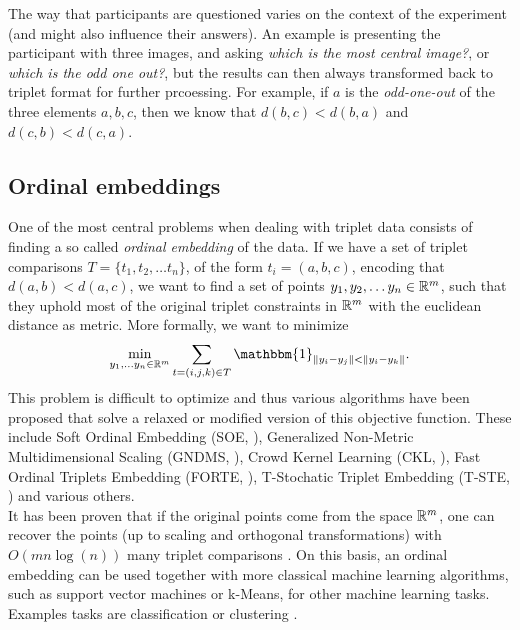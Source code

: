 The way that participants are questioned varies on the context of the experiment (and might also influence their answers). An
example is presenting the participant with three images, and asking \textit{which is the most central image?}, or \textit{which is the odd one out?},
but the results can then always transformed back to triplet format for further prcoessing. For example, if $a$ is the \textit{odd-one-out} of the three elements $a,b,c$, 
then we know that $d(b,c) < d(b,a)$ and $d(c, b) < d(c,a)$. 

\subsection{Ordinal embeddings}
One of the most central problems when dealing with triplet data consists of finding a so called \textit{ordinal embedding} of the data. If we have a set of triplet comparisons $T = \{t_1, t_2, \ldots t_n\}$, 
of the form $t_i = \left( a,b,c \right)$, encoding that $d(a,b) < d(a,c)$, 
we want to find a set of points $y_1, y_2, \ldots y_n \in \mathbb{R}^{m}$, such that they uphold most of the original triplet constraints in $\mathbb{R}^{m}$ with the euclidean distance
as metric. More formally, we want to minimize \citep{vankadaraInsightsOrdinalEmbedding2021}
\begin{align*}
    \min_{y_1, \ldots y_n \in \R^{m}} \sum_{t=\left( i,j,k \right)  \in T} \mathbbm{1}_{ \|y_i - y_j\| < \|y_i - y_k\| }
.\end{align*}
This problem is difficult to optimize and thus various algorithms have been proposed that solve a relaxed or modified version of this objective function. 
These include Soft Ordinal Embedding  (SOE, \cite{teradaLocalOrdinalEmbedding2014}), Generalized Non-Metric Multidimensional Scaling (GNDMS, \cite{agarwalGeneralizedNonmetricMultidimensional2007}), 
Crowd Kernel Learning (CKL, \cite{tamuzAdaptivelyLearningCrowd2011}), Fast Ordinal Triplets Embedding (FORTE, \cite{jainFiniteSamplePrediction2016}),
T-Stochatic Triplet Embedding (T-STE, \cite{laurensvandermaatenStochasticTripletEmbedding2012}) and various others. \\

It has been proven that if the original points come from the space $\mathbb{R}^{m}$, one can recover the points (up to scaling and orthogonal transformations) with $O(mn\log(n))$ many triplet comparisons
\citep{jainFiniteSamplePrediction2016}. On this basis, an ordinal embedding can be used together with more classical machine learning algorithms, such as support vector machines or k-Means,
for other machine learning tasks. Examples tasks are classification \citep{tamuzAdaptivelyLearningCrowd2011, kleindessnerLensDepthFunction2017} or clustering \citep{kleindessnerLensDepthFunction2017}.

